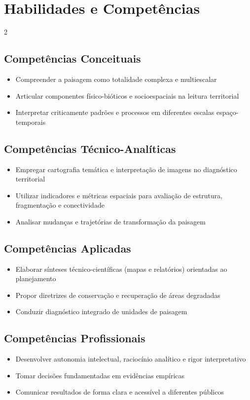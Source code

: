 \documentclass[11pt,a4paper]{article}
\begin{document}
\section*{Habilidades e Competências}

\begin{multicols}{2}
\subsection*{Competências Conceituais}
\begin{itemize}
\item Compreender a paisagem como totalidade complexa e multiescalar
\item Articular componentes físico-bióticos e socioespaciais na leitura territorial
\item Interpretar criticamente padrões e processos em diferentes escalas espaço-temporais
\end{itemize}

\subsection*{Competências Técnico-Analíticas}
\begin{itemize}
\item Empregar cartografia temática e interpretação de imagens no diagnóstico territorial
\item Utilizar indicadores e métricas espaciais para avaliação de estrutura, fragmentação e conectividade
\item Analisar mudanças e trajetórias de transformação da paisagem
\end{itemize}

\columnbreak

\subsection*{Competências Aplicadas}
\begin{itemize}
\item Elaborar sínteses técnico-científicas (mapas e relatórios) orientadas ao planejamento
\item Propor diretrizes de conservação e recuperação de áreas degradadas
\item Conduzir diagnóstico integrado de unidades de paisagem
\end{itemize}

\subsection*{Competências Profissionais}
\begin{itemize}
\item Desenvolver autonomia intelectual, raciocínio analítico e rigor interpretativo
\item Tomar decisões fundamentadas em evidências empíricas
\item Comunicar resultados de forma clara e acessível a diferentes públicos
\end{itemize}
\end{multicols}
\end{document}
